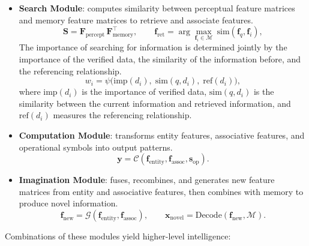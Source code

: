 \documentclass[12pt,a4paper]{article}
\newcommand{\Mem}{\mathcal{M}}
\newcommand{\Comp}{\mathcal{C}}
\newcommand{\Imag}{\mathcal{G}}
\begin{document}
\begin{itemize}
\item \textbf{Search Module}: computes similarity between perceptual feature matrices and memory feature matrices to retrieve and associate features.
\begin{equation}
\mathbf{S}=\mathbf{F}_{\mathrm{percept}}\,\mathbf{F}_{\mathrm{memory}}^{\top},\qquad
\mathbf{f}_{\mathrm{ret}}=\arg\max_{\mathbf{f}_i\in\Mem}\ \mathrm{sim}(\mathbf{f}_q,\mathbf{f}_i),
\label{eq:module-search}
\end{equation}
The importance of searching for information is determined jointly by the importance of the verified data, the similarity of the information before, and the referencing relationship.
\begin{equation}
w_i=\psi\bigl(\mathrm{imp}(d_i),\; \mathrm{sim}(q,d_i),\; \mathrm{ref}(d_i)\bigr),
\label{eq:module-search-importance}
\end{equation}
where $\mathrm{imp}(d_i)$ is the importance of verified data, $\mathrm{sim}(q,d_i)$ is the similarity between the current information and retrieved information, and $\mathrm{ref}(d_i)$ measures the referencing relationship.

\item \textbf{Computation Module}: transforms entity features, associative features, and operational symbols into output patterns.
\begin{equation}
\mathbf{y}=\Comp\left(\mathbf{f}_{\mathrm{entity}},\mathbf{f}_{\mathrm{assoc}},\mathbf{s}_{\mathrm{op}}\right).
\label{eq:module-computation}
\end{equation}

\item \textbf{Imagination Module}: fuses, recombines, and generates new feature matrices from entity and associative features, then combines with memory to produce novel information.
\begin{equation}
\mathbf{f}_{\mathrm{new}}=\Imag\left(\mathbf{f}_{\mathrm{entity}},\mathbf{f}_{\mathrm{assoc}}\right),\qquad
\mathbf{x}_{\mathrm{novel}}=\mathrm{Decode}\left(\mathbf{f}_{\mathrm{new}},\Mem\right).
\label{eq:module-imagination}
\end{equation}
\end{itemize}

Combinations of these modules yield higher-level intelligence:
\end{document}
